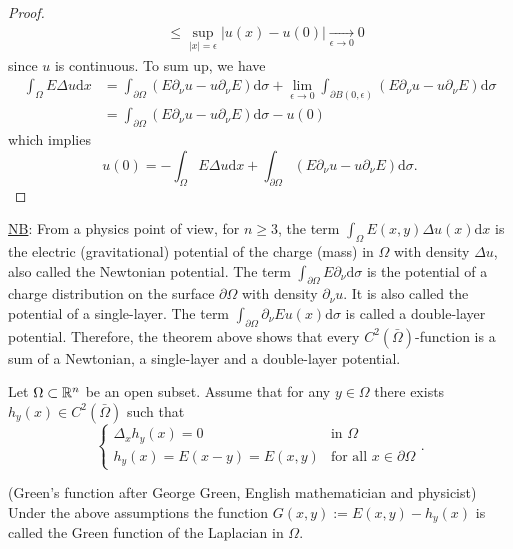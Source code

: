 \documentclass[11pt]{article}
\begin{document}
\begin{proof}
\begin{align*}
						&\le\sup_{|x|=\epsilon}|u(x)-u(0)|\underset{\epsilon\to0}{\longrightarrow}0
					\end{align*}
					since $u$ is continuous. To sum up, we have 
					\begin{align*}
						\int_\Omega E\Delta u \mathrm{d}x&=\int_{\partial\Omega}(E\partial_\nu u-u\partial_\nu E)\mathrm{d}\sigma+\lim_{\epsilon\to0}\int_{\partial B(0,\epsilon)}(E\partial_\nu u-u\partial_\nu E)\mathrm{d}\sigma\\
						&=\int_{\partial\Omega}(E\partial_\nu u-u\partial_\nu E)\mathrm{d}\sigma-u(0)
					\end{align*}
					which implies
					\begin{equation*}
						u(0)=-\int_\Omega E\Delta u \mathrm{d}x+\int_{\partial\Omega}(E\partial_\nu u-u\partial_\nu E)\mathrm{d}\sigma.
					\end{equation*}
				\end{proof}

				\noindent\underline{NB}: From a physics point of view, for $n\ge3$, the term $\int_\Omega E(x,y)\Delta u(x)\mathrm{d}x$ is the electric (gravitational) potential of the charge (mass) in $\Omega$ with density $\Delta u$, also called the Newtonian potential. The term $\int_{\partial\Omega}E\partial_\nu \mathrm{d}\sigma$ is the potential of a charge distribution on the surface $\partial\Omega$ with density $\partial_\nu u$. It is also called the potential of a single-layer. The term $\int_{\partial\Omega}\partial_\nu E u(x)\mathrm{d}\sigma$ is called a double-layer potential. Therefore, the theorem above shows that every $C^2(\bar{\Omega})$-function is a sum of a Newtonian, a single-layer and a double-layer potential.

				Let $\Omega\subset\mathbb{R}^n$ be an open subset. Assume that for any $y\in\Omega$ there exists $h_y(x)\in C^2(\bar{\Omega})$ such that
				\begin{equation*}
					\begin{cases}
						\Delta_x h_y(x)=0 & \text{in }\Omega\\
						h_y(x)=E(x-y)=E(x,y) & \text{for all }x\in\partial\Omega
					\end{cases}.
				\end{equation*}

				\begin{defi}
					(Green's function after George Green, English mathematician and physicist) Under the above assumptions the function $G(x,y):=E(x,y)-h_y(x)$ is called the Green function of the Laplacian in $\Omega$.
				\end{defi}
\end{document}
